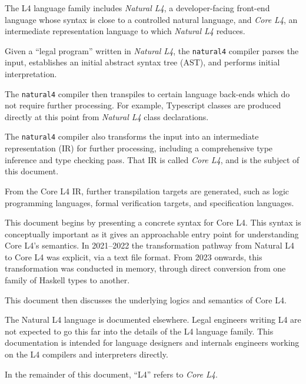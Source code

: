 \def\corelfour{\emph{Core L4}\xspace}
\def\naturalfour{\emph{Natural L4}\xspace}

The L4 language family includes \naturalfour, a developer-facing
front-end language whose syntax is close to a controlled natural
language, and \corelfour, an intermediate representation language to
which \naturalfour reduces.

Given a ``legal program'' written in \naturalfour, the \texttt{natural4}
compiler parses the input, establishes an initial abstract syntax tree
(AST), and performs initial interpretation.

The \texttt{natural4} compiler then transpiles to certain language
back-ends which do not require further processing. For example,
Typescript classes are produced directly at this point from \naturalfour
class declarations.

The \texttt{natural4} compiler also transforms the input into an
intermediate representation (IR) for further processing, including a
comprehensive type inference and type checking pass. That IR is called
\corelfour, and is the subject of this document.

From the Core L4 IR, further transpilation targets are
generated, such as logic programming languages, formal verification
targets, and specification languages.

This document begins by presenting a concrete syntax for Core L4. This
syntax is conceptually important as it gives an approachable entry
point for understanding Core L4's semantics. In 2021--2022 the
transformation pathway from Natural L4 to Core L4 was explicit, via a
text file format. From 2023 onwards, this transformation was conducted
in memory, through direct conversion from one family of Haskell types
to another.

This document then discusses the underlying logics and semantics of Core L4.

The Natural L4 language is documented elsewhere. Legal engineers
writing L4 are not expected to go this far into the details of the L4
language family. This documentation is intended for language designers
and internals engineers working on the L4 compilers and interpreters
directly.

In the remainder of this document, ``L4'' refers to \corelfour.




